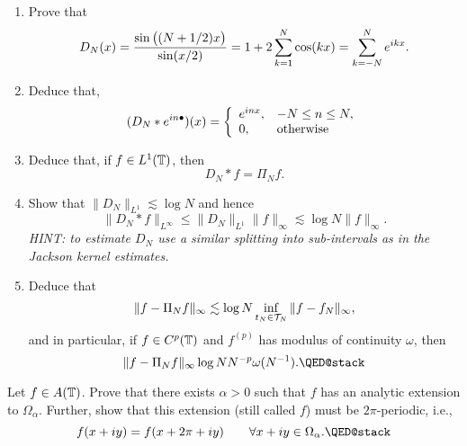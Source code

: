 \begin{exercise} \label{exr:trig:dirichlet}
  \begin{enumerate} \ilist
    \item Prove that
    \[
      D_N(x) = \frac{\sin\big((N+1/2) x\big)}{\sin(x/2)}
            = 1 + 2 \sum_{k = 1}^N \cos(k x)
            = \sum_{k = -N}^N e^{ikx}.
    \]
    \item Deduce that,
    \[
      (D_N \ast e^{in \bullet})(x) =
        \left\{ \begin{array}{ll} 
          e^{inx}, & -N \leq n \leq N, \\
          0, & \text{otherwise}
         \end{array} \right.
    \]
    \item Deduce that, if $f \in L^1(\mathbb{T})$, then
    \[
        D_N \ast f = \Pi_N f.
    \]
    \item Show that $\|D_N\|_{L^1} \lesssim \log N$ and hence
    \[
        \| D_N \ast f \|_{L^\infty} \leq \|D_N \|_{L^1} \|f\|_\infty
          \lesssim \log N \|f\|_\infty.
    \]
    {\it HINT: to estimate $D_N$ use a similar splitting into sub-intervals
    as in the Jackson kernel estimates.}
    \item Deduce that
    \[
        \| f - \Pi_N f \|_{\infty}
        \lesssim  \log N \inf_{t_N \in \mathcal{T}_N} \| f - f_N \|_\infty,
    \]
    and in particular, if $f \in C^p(\mathbb{T})$ and $f^{(p)}$ has modulus of
    continuity $\omega$, then
    \[
        \| f - \Pi_N f \|_\infty \log N N^{-p} \omega(N^{-1}). \qedhere
    \]

  \end{enumerate}
\end{exercise}


\begin{exercise} \label{exr:trig:periodic extension}
  Let $f \in A(\mathbb{T})$. Prove that there exists $\alpha > 0$ such that $f$ has an
  analytic extension to $\Omega_\alpha$. Further, show that this extension
  (still called $f$) must be $2\pi$-periodic, i.e.,
  \[
      f(x + i y) = f(x + 2\pi + i y) \qquad \forall x+iy \in \Omega_\alpha. \qedhere
  \]
\end{exercise}


